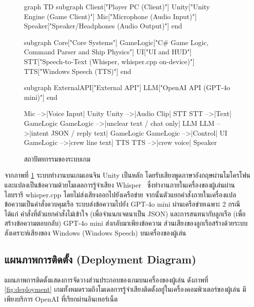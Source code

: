 \begin{figure}[!htbp]
\centering
\begin{mermaid}
graph TD
    subgraph Client["Player PC (Client)"]
        Unity["Unity Engine (Game Client)"]
        Mic["Microphone (Audio Input)"]
        Speaker["Speaker/Headphones (Audio Output)"]
    end

    subgraph Core["Core Systems"]
        GameLogic["C# Game Logic, Command Parser and Ship Physics"]
        UI["UI and HUD"]
        STT["Speech-to-Text (Whisper, whisper.cpp on-device)"]
        TTS["Windows Speech (TTS)"]
    end

    subgraph ExternalAPI["External API"]
        LLM["OpenAI API (GPT-4o mini)"]
    end

    Mic -->|Voice Input| Unity
    Unity -->|Audio Clip| STT
    STT -->|Text| GameLogic
    GameLogic -->|unclear text / chat only| LLM
    LLM -->|intent JSON / reply text| GameLogic
    GameLogic -->|Control| UI
    GameLogic -->|crew line text| TTS
    TTS -->|crew voice| Speaker
\end{mermaid}
\caption{สถาปัตยกรรมของระบบเกม}
\label{fig:architecture}
\end{figure}

จากภาพที่ \ref{fig:architecture} ระบบทำงานบนเกมเอนจิน Unity เป็นหลัก โดยรับเสียงพูดภาษาอังกฤษผ่านไมโครโฟน และแปลงเป็นข้อความด้วยโมเดลการรู้จำเสียง Whisper~\cite{radford2023} ซึ่งทำงานภายในเครื่องของผู้เล่นผ่านไลบรารี whisper.cpp โดยไม่ส่งเสียงออกไปยังเครือข่าย จากนั้นตัวแยกคำสั่งภายในเครื่องแปลข้อความเป็นคำสั่งควบคุมเรือ ระบบส่งข้อความไปยัง GPT-4o mini ผ่านเครือข่ายเฉพาะ 2 กรณี ได้แก่ คำสั่งที่ตัวแยกคำสั่งไม่เข้าใจ (เพื่อจำแนกเจตนาเป็น JSON) และการสนทนากับลูกเรือ (เพื่อสร้างข้อความตอบกลับ) GPT-4o mini ส่งกลับมาเพียงข้อความ ส่วนเสียงของลูกเรือสร้างด้วยระบบสังเคราะห์เสียงของ Windows (Windows Speech) บนเครื่องของผู้เล่น

\subsection{แผนภาพการติดตั้ง (Deployment Diagram)}

แผนภาพการติดตั้งแสดงการจัดวางส่วนประกอบของเกมบนเครื่องของผู้เล่น ดังภาพที่ \ref{fig:deployment} เกมทั้งหมดรวมถึงโมเดลการรู้จำเสียงติดตั้งอยู่ในเครื่องคอมพิวเตอร์ของผู้เล่น มีเพียงบริการ OpenAI ที่เรียกผ่านอินเทอร์เน็ต

